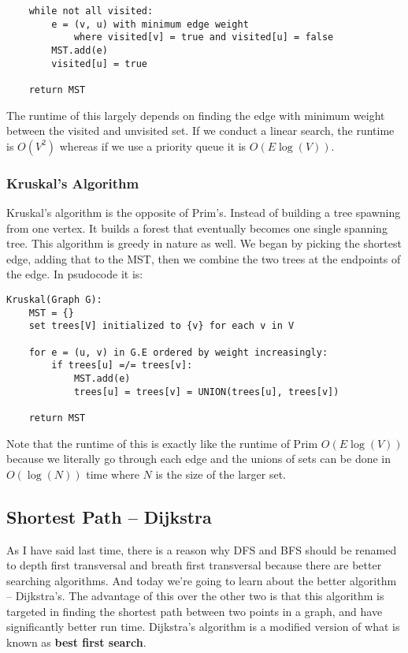\documentclass[12 pt, twoside] {article}
\begin{document}
{\begin{verbatim}
    while not all visited:
        e = (v, u) with minimum edge weight
            where visited[v] = true and visited[u] = false
        MST.add(e)
        visited[u] = true

    return MST
\end{verbatim}

The runtime of this largely depends on finding the edge with minimum weight
between the visited and unvisited set. If we conduct a linear search, the
runtime is $O(V^2)$ whereas if we use a priority queue it is $O(E \log(V))$.

\subsubsection*{Kruskal's Algorithm}

Kruskal's algorithm is the opposite of Prim's. Instead of building a tree
spawning from one vertex. It builds a forest that eventually becomes one single
spanning tree. This algorithm is greedy in nature as well. We began by picking
the shortest edge, adding that to the MST, then we combine the two trees at the
endpoints of the edge. In psudocode it is:
\begin{verbatim}
Kruskal(Graph G):
    MST = {}
    set trees[V] initialized to {v} for each v in V

    for e = (u, v) in G.E ordered by weight increasingly:
        if trees[u] =/= trees[v]:
            MST.add(e)
            trees[u] = trees[v] = UNION(trees[u], trees[v])

    return MST
\end{verbatim}

Note that the runtime of this is exactly like the runtime of Prim $O(E \log(V))$
because we literally go through each edge and the unions of sets can be done in
$O(\log(N))$ time where $N$ is the size of the larger set.

\subsection*{Shortest Path -- Dijkstra}

As I have said last time, there is a reason why DFS and BFS should be renamed to
depth first transversal and breath first transversal because there are better
searching algorithms. And today we're going to learn about the better algorithm
-- Dijkstra's. The advantage of this over the other two is that this algorithm
is targeted in finding the shortest path between two points in a graph, and have
significantly better run time. Dijkstra's algorithm is a modified version of
what is known as \textbf{best first search}.

}
\end{document}
